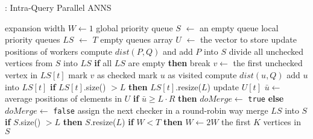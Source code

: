 \begin{algorithm}[h]
\small
\DontPrintSemicolon
\caption{\Hammer: Intra-Query Parallel ANNS}\label{algo:par_stale_search}
expansion width $W \gets 1$\;
global priority queue $S$ $\gets$ an empty queue\;
local priority queues $LS$ $\gets$ $T$ empty queues\; \label{algo_line:stale_local_queues}
array $U$ $\gets$ the vector to store update positions of workers\;
compute $dist(P, Q)$ and add $P$ into $S$\;
 { \label{algo_line:stale_global_step_begin}
    divide all unchecked vertices from $S$ into $LS$\; \label{algo_line:stale_dispatching}
    \textbf{if} all $LS$ are empty \textbf{then} break\;
     {
         { \label{algo_line:stale_substate_start}
            $v \gets$ the first unchecked vertex in $LS[t]$\;
            mark $v$ as checked\;
             { \label{algo_line:stale_neighbor_start}
                 {\label{algo_line:stale_check_map}
                    mark $u$ as visited\; \label{algo_line:stale_update_map}
                    compute $dist(u, Q)$\;
                    add $u$ into $LS[t]$\;
                }
            } \label{algo_line:stale_neighbor_end}
            \textbf{if} $LS[t]$.size() $> L$ \textbf{then} $LS[t]$.resize($L$)\;
            update $U[t]$\;
             {
                $\bar{u} \gets$ average positions of elements in $U$\; \label{algo_line:aup_begin}
                \textbf{if} $\bar{u} \geq L \cdot R$ \textbf{then} $doMerge \gets$ \texttt{true}\; \label{algo_line:check_metric}
                \textbf{else} $doMerge \gets$ \texttt{false}\; \label{algo_line:aup_end}
                assign the next checker in a round-robin way\;
            }
       } \label{algo_line:stale_substate_end}
    }
    merge $LS$ into $S$\; \label{algo_line:stale_merge}
    \textbf{if} $S$.size() $> L$ \textbf{then} $S$.resize($L$)\;
    \textbf{if} $W < T$ \textbf{then} $W \gets 2W$\;
} \label{algo_line:stale_global_step_end}
\Return the first $K$ vertices in $S$\;


\end{algorithm}
